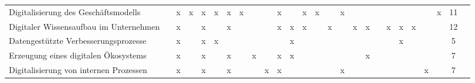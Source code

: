 \begin{sidewaystable}[ht]
\begin{tabular}{|p{6cm}|c|c|c|c|c|c|c|c|c|c|c|c|c|c|c|c|c|c|c|c|c|c|c|c|c|}
		Digitalisierung des Geschäftsmodells     &                   & x                  & x                  & x                    & x                  & x                 & x                 &                      &                    & x                    &                  & x                & x                   &                  & x               &                      &                    &                 &                  &                  &                        &                      & x                      & 11 \\
		Digitaler Wissensaufbau im Unternehmen              &                   & x                  &                    & x                    &                    & x                 &                   &                      &                    & x                    & x                & x                &                     & x                &                 & x                    & x                  &                 & x                & x                & x                      &                      &                        & 12 \\
		Datengestützte Verbesserungsprozesse    &                   & x                  &                    & x                    & x                  &                   &                   &                      &                    &                      & x                &                  &                     &                  &                 &                      &                    &                 &                  & x                &                        &                      &                        & 5  \\
		Erzeugung eines digitalen Ökosystems &                   & x                  &                    & x                    &                    & x                 &                   & x                    &                    & x                    & x                &                  &                     &                  &                 &                      & x                  &                 &                  &                  &                        &                      &                        & 7  \\
		Digitalisierung von internen Prozessen              &                   & x                  &                    & x                    &                    & x                 &                   &                      & x                  & x                    &                  &                  &                     &                  & x               &                      &                    &                 &                  &                  &                        & x                    &                        & 7  \\

\end{tabular}
\end{sidewaystable}

